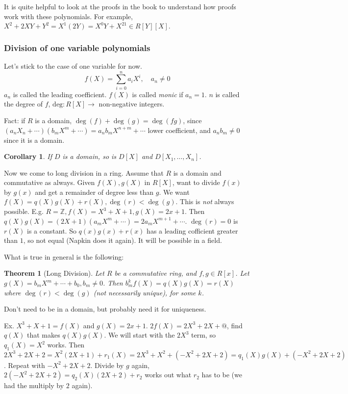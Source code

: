 \documentclass{article}
\theoremstyle{plain}
\newtheorem{theorem}{Theorem}
\newtheorem{corollary}{Corollary}
\theoremstyle{remark}
\newcommand{\Z}{{\mathbb Z}}
\begin{document}
It is quite helpful to look at the proofs in the book to understand
how proofs work with these polynomials.
For example, $X^2 + 2XY + Y^2 = X^1(2Y) = X^0Y + X^21 \in R[Y][X]$.

\subsubsection{Division of one variable polynomials}
Let's stick to the case of one variable for now.
\[
	f(X) = \sum_{i=0}^n a_i X^i, \quad a_n \neq 0
\]
$a_n$ is called the leading coefficient.
$f(X)$ is called \emph{monic} if $a_n = 1$.
$n$ is called the degree of $f$,
$\mathrm{deg} \colon R[X] \to $ non-negative integers.

Fact: if $R$ is a domain, $\deg(f) + \deg(g) = \deg(fg)$,
since $(a_nX_n + \cdots)(b_mX^m + \cdots) = a_nb_mX^{n+m} + \cdots$
lower coefficient, and $a_nb_m \neq 0$ since it is a domain.
\begin{corollary}
	If $D$ is a domain, so is $D[X]$ and $D[X_1,\dots,X_n]$.
\end{corollary}

Now we come to long division in a ring.
Assume that $R$ is a domain and commutative as always.
Given $f(X), g(X)$ in $R[X]$, want to divide $f(x)$ by $g(x)$
and get a remainder of degree less than $g$.
We want  $f(X) = q(X)g(X) + r(X), \deg(r) < \deg(g)$.
This is \emph{not} always possible.
E.g. $R = \Z, f(X) = X^3 + X +1, g(X) = 2x + 1$.
Then $q(X)g(X) = (2X+1)(a_mX^m+\cdots) = 2a_mX^{m+1} + \cdots$.
$\deg(r) = 0$ is $r(X)$ is a constant.
So $q(x)g(x) + r(x)$ has a leading cofficient greater than $1$,
so not equal (Napkin does it again).
It will be possible in a field.

What is true in general is the following:
\begin{theorem}[Long Division]
	Let $R$ be a commutative ring, and $f,g \in R[x]$.
	Let $g(X) = b_mX^{m} + \cdots + b_0, b_m \neq 0$.
	Then $b^k_mf(X) = q(X)g(X) = r(X)$ where $\deg(r) < \deg(g)$
	(not necessarily unique), for some $k$.
\end{theorem}
Don't need to be in a domain, but probably need it for uniqueness.

Ex. $X^3 + X + 1 = f(X)$ and $g(X) = 2x + 1$.
$2f(X) = 2X^3 + 2X + @$,
find $q(X)$ that makes $q(X)g(X)$.
We will start with the $2X^3$ term, so $q_1(X) = X^2$ works.
Then $2X^3 + 2X + 2 = X^2(2X+1) + r_1(X)
= 2X^3 + X^2 + (-X^2 + 2X + 2) = q_1(X)g(X) + (-X^2 + 2X + 2)$.
Repeat with $-X^2+2X+2$.
Divide by $g$ again, $2(-X^2 + 2X + 2) = q_2(X)(2X + 2) + r_2$
works out what $r_2$ has to be
(we had the multiply by $2$ again).
\end{document}
